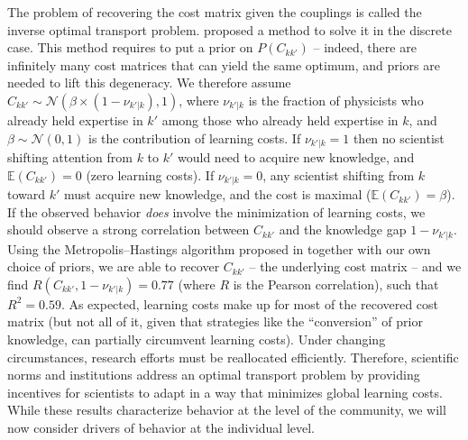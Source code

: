 \documentclass{article}
\begin{document}
The problem of recovering the cost matrix given the couplings is called the inverse optimal transport problem. \citet{Chu2021} proposed a method to solve it in the discrete case. This method requires to put a prior on $P(C_{kk'})$ -- indeed, there are infinitely many cost matrices that can yield the same optimum, and priors are needed to lift this degeneracy. We therefore assume $C_{kk'}\sim \mathcal{N}(\beta \times (1-\nu_{k'|k}),1)$, where $\nu_{k'|k}$ is the fraction of physicists who already held expertise in $k'$ among those who already held expertise in $k$, and $\beta\sim\mathcal{N}(0,1)$ is the contribution of learning costs. If $\nu_{k'|k}=1$ then no scientist shifting attention from $k$ to $k'$ would need to acquire new knowledge, and $\mathbb{E}(C_{kk'})=0$ (zero learning costs). If $\nu_{k'|k}=0$, any scientist shifting from $k$ toward $k'$ must acquire new knowledge, and the cost is maximal ($\mathbb{E}(C_{kk'})=\beta$). If the observed behavior \textit{does} involve the minimization of learning costs, we should observe a strong correlation between $C_{kk'}$ and the knowledge gap $1-\nu_{k'|k}$.  Using the Metropolis–Hastings algorithm proposed in \citealt{Chu2021} together with our own choice of priors, we are able to recover $C_{kk'}$ -- the underlying cost matrix -- and we find $R(C_{kk'},1-\nu_{k'|k})=0.77$ (where $R$ is the Pearson correlation), such that $R^2=0.59$. As expected, learning costs make up for most of the recovered cost matrix (but 
 not all of it, given that strategies like the ``conversion'' of prior knowledge, can partially circumvent learning costs). Under changing circumstances, research efforts must be reallocated efficiently. Therefore, scientific norms and institutions address an optimal transport problem by providing incentives for scientists to adapt in a way that minimizes global learning costs. While these results characterize behavior at the level of the community, we will now consider drivers of behavior at the individual level.


\end{document}
